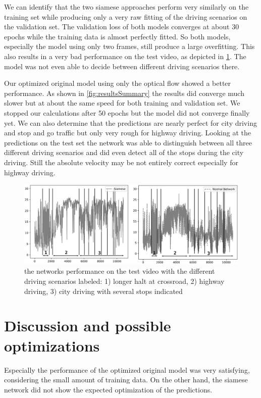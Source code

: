 \documentclass[conference]{IEEEtran}
\begin{document}
We can identify that the two siamese approaches perform very similarly on the training set while producing only a very raw fitting of the driving scenarios on the validation set. The validation loss of both models converges at about 30 epochs while the training data is almost perfectly fitted. So both models, especially the model using only two frames, still produce a large overfitting. This also results in a very bad performance on the test video, as depicted in \cref{fig:resultsTestvideo}. The model was not even able to decide between different driving scenarios there.

Our optimized original model using only the optical flow showed a better performance. As shown in \ref{fig:resultsSummary} the results did converge much slower but at about the same speed for both training and validation set. We stopped our calculations after 50 epochs but the model did not converge finally yet. We can also determine that the predictions are nearly perfect for city driving and stop and go traffic but only very rough for highway driving. Looking at the predictions on the test set the network was able to distinguish between all three different driving scenarios and did even detect all of the stops during the city driving. Still the absolute velocity may be not entirely correct especially for highway driving.

\begin{figure}[ht]
	\centering
	\includegraphics[width=0.99\columnwidth]{imgs/both_testvideo.eps}
	\caption{the networks performance on the test video with the different driving scenarios labeled: 1) longer halt at crossroad, 2) highway driving, 3) city driving with several stops indicated}
	\label{fig:resultsTestvideo}
\end{figure}

\section{Discussion and possible optimizations}

Especially the performance of the optimized original model was very satisfying, considering the small amount of training data. On the other hand, the siamese network did not show the expected 
optimization of the predictions.
\end{document}
